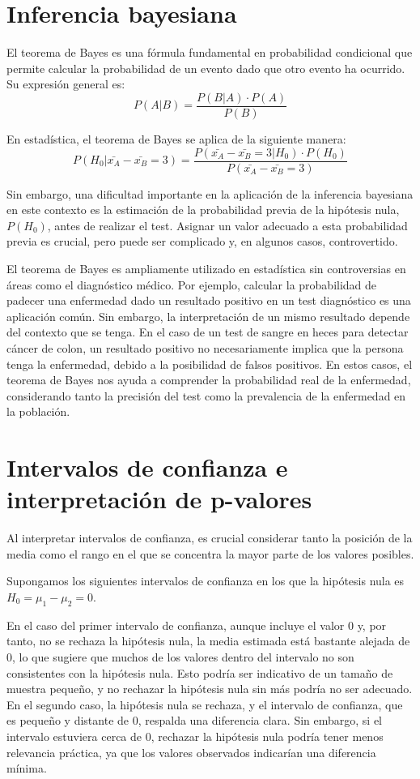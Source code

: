 \documentclass{config/apuntes}\usepackage[]{graphicx}\usepackage[]{xcolor}
\begin{document}
\section{Inferencia bayesiana}
El teorema de Bayes es una fórmula fundamental en probabilidad condicional que permite calcular la probabilidad de un evento dado que otro evento ha ocurrido. Su expresión general es:
$$P(A|B) = \frac{P(B|A) \cdot P(A)}{P(B)}$$

En estadística, el teorema de Bayes se aplica de la siguiente manera:
$$P(H_0|\bar{x_A}-\bar{x_B} = 3) = \frac{P(\bar{x_A}-\bar{x_B} = 3 | H_0) \cdot P(H_0)}{P(\bar{x_A}-\bar{x_B} = 3)}$$

Sin embargo, una dificultad importante en la aplicación de la inferencia bayesiana en este contexto es la estimación de la probabilidad previa de la hipótesis nula, $P(H_0)$, antes de realizar el test. Asignar un valor adecuado a esta probabilidad previa es crucial, pero puede ser complicado y, en algunos casos, controvertido.

El teorema de Bayes es ampliamente utilizado en estadística sin controversias en áreas como el diagnóstico médico. Por ejemplo, calcular la probabilidad de padecer una enfermedad dado un resultado positivo en un test diagnóstico es una aplicación común. 
Sin embargo, la interpretación de un mismo resultado depende del contexto que se tenga.
En el caso de un test de sangre en heces para detectar cáncer de colon, un resultado positivo no necesariamente implica que la persona tenga la enfermedad, debido a la posibilidad de falsos positivos. En estos casos, el teorema de Bayes nos ayuda a comprender la probabilidad real de la enfermedad, considerando tanto la precisión del test como la prevalencia de la enfermedad en la población.

\section{Intervalos de confianza e interpretación de p-valores}
Al interpretar intervalos de confianza, es crucial considerar tanto la posición de la media como el rango en el que se concentra la mayor parte de los valores posibles.

Supongamos los siguientes intervalos de confianza en los que la hipótesis nula es $H_0 = \mu_1 - \mu_2 = 0$.

En el caso del primer intervalo de confianza, aunque incluye el valor 0 y, por tanto, no se rechaza la hipótesis nula, la media estimada está bastante alejada de 0, lo que sugiere que muchos de los valores dentro del intervalo no son consistentes con la hipótesis nula. Esto podría ser indicativo de un tamaño de muestra pequeño, y no rechazar la hipótesis nula sin más podría no ser adecuado. En el segundo caso, la hipótesis nula se rechaza, y el intervalo de confianza, que es pequeño y distante de 0, respalda una diferencia clara. Sin embargo, si el intervalo estuviera cerca de 0, rechazar la hipótesis nula podría tener menos relevancia práctica, ya que los valores observados indicarían una diferencia mínima.
\end{document}
